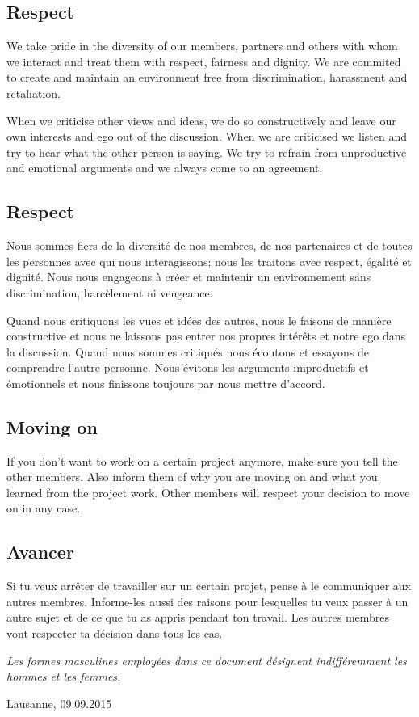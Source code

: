 \english
	\subsection{Respect}
 	We take pride in the diversity of our members, partners and others with whom we interact and treat them with respect, fairness and dignity. We are commited to create and maintain an environment free from discrimination, harassment and retaliation. 

 	When we criticise other views and ideas, we do so constructively and leave our own interests and ego out of the discussion. 
 	When we are criticised we listen and try to hear what the other person is saying. 
 	We try to refrain from unproductive and emotional arguments and we always come to an agreement.
	\vspace{1cm}


\french
	\subsection{Respect}
	Nous sommes fiers de la diversité de nos membres, de nos partenaires et de toutes les personnes avec qui nous interagissons; nous les traitons avec respect, égalité et dignité. Nous nous engageons à créer et maintenir un environnement sans discrimination, harcèlement ni vengeance. 

	Quand nous critiquons les vues et idées des autres, nous le faisons de manière constructive et nous ne laissons pas entrer nos propres intérêts et notre ego dans la discussion.
	Quand nous sommes critiqués nous écoutons et essayons de comprendre l'autre personne. 
	Nous évitons les arguments improductifs et émotionnels et nous finissons toujours par nous mettre d'accord.

\english
	\subsection{Moving on}
	If you don't want to work on a certain project anymore, make sure you tell the other members. Also inform them of why you are moving on and what you learned from the project work. Other members will respect your decision to move on in any case.

\french
	\subsection{Avancer}
	Si tu veux arrêter de travailler sur un certain projet, pense à le communiquer aux autres membres. Informe-les aussi des raisons pour lesquelles tu veux passer à un autre sujet et de ce que tu as appris pendant ton travail. Les autres membres vont respecter ta décision dans tous les cas.
	\vspace{3cm}

	\textit{Les formes masculines employées dans ce document désignent indifféremment les hommes et les femmes.}

\english

	\vspace{16cm}
	
	\noindent
	Lausanne, 09.09.2015
	\vspace {1.5cm}

	\noindent
	\hrulefill \\
 
	\vspace {1.0cm}
 	\noindent 
 	\hrulefill \\
 	

 	


